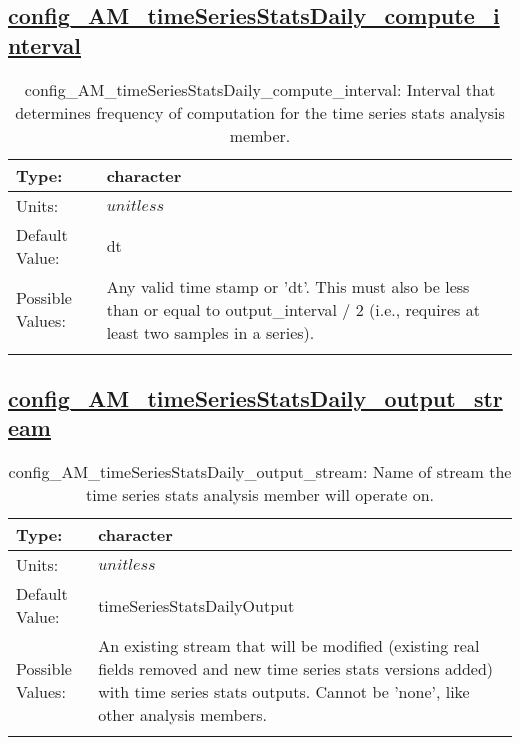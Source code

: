 \subsection[config\_AM\_timeSeriesStatsDaily\_compute\_interval]{\hyperref[sec:nm_tab_AM_timeSeriesStatsDaily]{config\_AM\_timeSeriesStatsDaily\_compute\_interval}}
\label{subsec:nm_sec_config_AM_timeSeriesStatsDaily_compute_interval}
\begin{center}
\begin{longtable}{| p{2.0in} || p{4.0in} |}
    \hline
    Type: & character \\
    \hline
    Units: & $unitless$ \\
    \hline
    Default Value: & dt \\
    \hline
    Possible Values: & Any valid time stamp or 'dt'. This must also be less than or equal to output\_interval / 2 (i.e., requires at least two samples in a series). \\
    \hline
    \caption{config\_AM\_timeSeriesStatsDaily\_compute\_interval: Interval that determines frequency of computation for the time series stats analysis member.}
\end{longtable}
\end{center}
\subsection[config\_AM\_timeSeriesStatsDaily\_output\_stream]{\hyperref[sec:nm_tab_AM_timeSeriesStatsDaily]{config\_AM\_timeSeriesStatsDaily\_output\_stream}}
\label{subsec:nm_sec_config_AM_timeSeriesStatsDaily_output_stream}
\begin{center}
\begin{longtable}{| p{2.0in} || p{4.0in} |}
    \hline
    Type: & character \\
    \hline
    Units: & $unitless$ \\
    \hline
    Default Value: & timeSeriesStatsDailyOutput \\
    \hline
    Possible Values: & An existing stream that will be modified (existing real fields removed and new time series stats versions added) with time series stats outputs. Cannot be 'none', like other analysis members. \\
    \hline
    \caption{config\_AM\_timeSeriesStatsDaily\_output\_stream: Name of stream the time series stats analysis member will operate on.}
\end{longtable}
\end{center}
